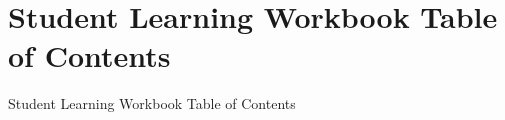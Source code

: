 \documentclass{beamer}
\title{ }
\author{ }
\institute{ }
\date{} %
\begin{document}
\section*{Student Learning Workbook Table of Contents}\begin{frame}{Student Learning Workbook Table of Contents}\tableofcontents\end{frame}


\end{document}
